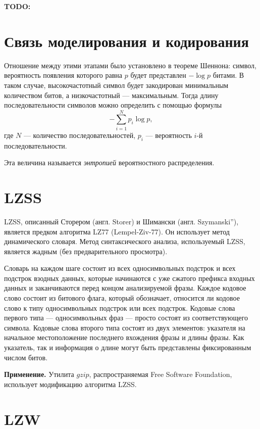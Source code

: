 \textbf{TODO:}

\section{Связь моделирования и кодирования}

Отношение между этими этапами было установлено в теореме Шеннона: символ, вероятность появления которого равна $p$ будет представлен \begin{math}-\log{p}\end{math} битами.
В таком случае, высокочастотный символ будет закодирован минимальным количеством битов, а низкочастотный --- максимальным. Тогда длину последовательности символов можно определить с помощью формулы
\begin{equation}\label{entropy}
   -\displaystyle\sum_{i=1}^{N}p_{i}\log{p},
\end{equation}
где $N$ --- количество последовательностей, $p_{i}$ --- вероятность $i$-й последовательности.

Эта величина называется \textit{энтропией} вероятностного распределения.

\section{LZSS}

LZSS, описанный Сторером (англ. Storer) и Шимански (англ. Szymanski”), является предком алгоритма LZ77 (Lempel-Ziv-77). 
Он использует метод динамического словаря.
Метод синтаксического анализа, используемый LZSS, является жадным (без предварительного просмотра).

Словарь на каждом шаге состоит из всех односимвольных подстрок и всех подстрок взодных данных, которые начинаются с уже сжатого префикса входных данных и заканчиваются перед концом анализируемой фразы.
Каждое кодовое слово состоит из битового флага, который обозначает, относится ли кодовое слово к типу односимвольных подстрок или всех подстрок.
Кодовые слова первого типа --- односимвольных фраз --- просто состоят из соответствующего символа.
Кодовые слова второго типа состоят из двух элементов: указателя на начальное местоположение последнего вхождения фразы и длины фразы.
Как указатель, так и информация о длине могут быть представлены фиксированным числом битов. \cite{sayood2002lossless}

\textbf{Применение.} Утилита $gzip$, распространяемая Free Software Foundation, использует модификацию алгоритма LZSS.

\section{LZW}

